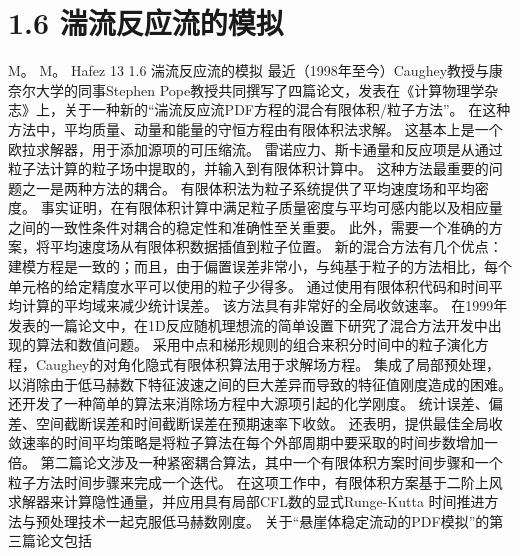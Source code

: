 \documentclass[UTF8,11pt,a4paper,openany,fontset=fandol]{ctexbook}
\begin{document}
\section{1.6 湍流反应流的模拟}
M。 M。 Hafez 13 1.6 湍流反应流的模拟 最近（1998年至今）Caughey教授与康奈尔大学的同事Stephen Pope教授共同撰写了四篇论文，发表在《计算物理学杂志》上，关于一种新的“湍流反应流PDF方程的混合有限体积/粒子方法”。 在这种方法中，平均质量、动量和能量的守恒方程由有限体积法求解。 这基本上是一个欧拉求解器，用于添加源项的可压缩流。 雷诺应力、斯卡通量和反应项是从通过粒子法计算的粒子场中提取的，并输入到有限体积计算中。 这种方法最重要的问题之一是两种方法的耦合。 有限体积法为粒子系统提供了平均速度场和平均密度。 事实证明，在有限体积计算中满足粒子质量密度与平均可感内能以及相应量之间的一致性条件对耦合的稳定性和准确性至关重要。 此外，需要一个准确的方案，将平均速度场从有限体积数据插值到粒子位置。 新的混合方法有几个优点：建模方程是一致的；而且，由于偏置误差非常小，与纯基于粒子的方法相比，每个单元格的给定精度水平可以使用的粒子少得多。 通过使用有限体积代码和时间平均计算的平均域来减少统计误差。 该方法具有非常好的全局收敛速率。 在1999年发表的一篇论文中，在1D反应随机理想流的简单设置下研究了混合方法开发中出现的算法和数值问题。 采用中点和梯形规则的组合来积分时间中的粒子演化方程，Caughey的对角化隐式有限体积算法用于求解场方程。 集成了局部预处理，以消除由于低马赫数下特征波速之间的巨大差异而导致的特征值刚度造成的困难。 还开发了一种简单的算法来消除场方程中大源项引起的化学刚度。 统计误差、偏差、空间截断误差和时间截断误差在预期速率下收敛。 还表明，提供最佳全局收敛速率的时间平均策略是将粒子算法在每个外部周期中要采取的时间步数增加一倍。 第二篇论文涉及一种紧密耦合算法，其中一个有限体积方案时间步骤和一个粒子方法时间步骤来完成一个迭代。 在这项工作中，有限体积方案基于二阶上风求解器来计算隐性通量，并应用具有局部CFL数的显式Runge-Kutta 时间推进方法与预处理技术一起克服低马赫数刚度。 关于“悬崖体稳定流动的PDF模拟”的第三篇论文包括
\end{document}
